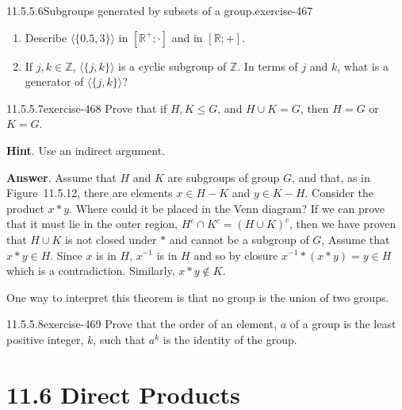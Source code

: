 \documentclass[twoside,10pt,]{book}
\numberwithin{equation}{section}
\begin{document}
\begin{divisionsolution}{11.5.5.6}{Subgroups generated by subsets of a group.}{exercise-467}
\begin{enumerate}[label=(\alph*)]
\item\hypertarget{li-1891}{}\hypertarget{p-4148}{}%
Describe \(\langle \{0.5, 3\}\rangle \) in \(\left[ \mathbb{R}^+;\cdot \right]\) and in \([\mathbb{R}; +]\).%
\item\hypertarget{li-1892}{}\hypertarget{p-4149}{}%
If \(j, k \in  \mathbb{Z}\), \(\langle\{j,k\}\rangle\) is a cyclic subgroup of \(\mathbb{Z}\). In terms of \(j\) and \(k\), what is a generator of \(\langle \{j, k\}\rangle \)?%
\end{enumerate}
%
\end{divisionsolution}%
\begin{divisionsolution}{11.5.5.7}{}{exercise-468}%
\hypertarget{p-4150}{}%
Prove that if \(H,K \leq  G\), and \(H\cup K=G\), then \(H = G\) or \(K = G\).%
\par\smallskip%
\noindent\textbf{Hint}.\quad%
\hypertarget{p-4151}{}%
Use an indirect argument.%
\par\smallskip%
\noindent\textbf{Answer}.\quad%
\hypertarget{p-4152}{}%
Assume that \(H\) and \(K\) are subgroups of group \(G\), and that, as in Figure~11.5.12, there are elements \(x \in  H - K\) and \(y \in  K - H\). Consider the product \(x * y\). Where could it be placed in the Venn diagram? If we can prove that it must lie in the outer region, \(H^c \cap K^c=(H \cup K)^c\), then we have proven that \(H \cup  K\) is not closed under \(*\) and cannot be a subgroup of \(G\), Assume that  \(x*y\in H\).  Since \(x\) is in  \(H\),  \(x^{-1}\) is in \(H\) and so by closure \(x^{-1}*(x * y )= y \in H\) which is a contradiction.   Similarly, \(x*y \notin K\).%
\par
\hypertarget{p-4153}{}%
One way to interpret this theorem is that no group is the union of two groups.%
\end{divisionsolution}%
\begin{divisionsolution}{11.5.5.8}{}{exercise-469}%
\hypertarget{p-4154}{}%
Prove that the order of an element, \(a\) of a group is the least positive integer, \(k\), such that \(a^k\) is the identity of the group.%
\end{divisionsolution}%
\section*{11.6 Direct Products}
\end{document}
